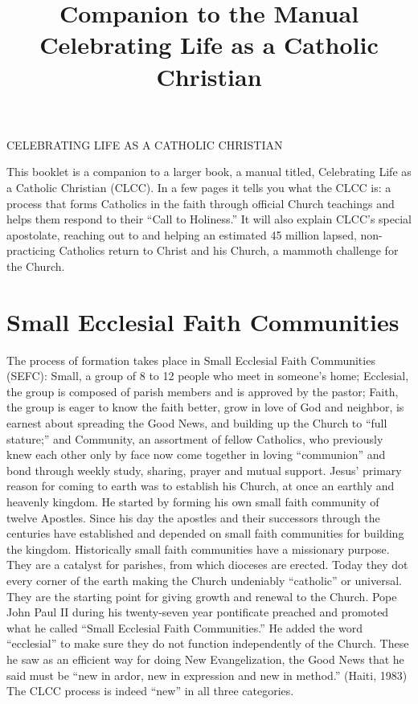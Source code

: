 \documentclass{article}
\title{\textbf{Companion to the Manual} \\ Celebrating Life as a Catholic Christian}
\date{}
\begin{document}
CELEBRATING LIFE AS A CATHOLIC CHRISTIAN

This booklet is a companion to a larger book, a manual titled, Celebrating Life
as a Catholic Christian (CLCC). In a few pages it tells you what the CLCC is: a
process that forms Catholics in the faith through official Church teachings and
helps them respond to their ``Call to Holiness.'' It will also explain CLCC's
special apostolate, reaching out to and helping an estimated 45 million lapsed,
non-practicing Catholics return to Christ and his Church, a mammoth challenge
for the Church.

\section{Small Ecclesial Faith Communities}

The process of formation takes place in Small Ecclesial Faith Communities
(SEFC): Small, a group of 8 to 12 people who meet in someone's home; Ecclesial,
the group is composed of parish members and is approved by the pastor; Faith,
the group is eager to know the faith better, grow in love of God and neighbor,
is earnest about spreading the Good News, and building up the Church to ``full
stature;'' and Community, an assortment of fellow Catholics, who previously knew
each other only by face now come together in loving ``communion'' and bond
through weekly study, sharing, prayer and mutual support.
Jesus' primary reason for coming to earth was to establish his Church, at once
an earthly and heavenly kingdom. He started by forming his own small faith
community of twelve Apostles. Since his day the apostles and their successors
through the centuries have established and depended on small faith communities
for building the kingdom. Historically small faith communities have a missionary
purpose. They are a catalyst for parishes, from which dioceses are
erected. Today they dot every corner of the earth making the Church undeniably
``catholic'' or universal. They are the starting point for giving growth and
renewal to the Church.
Pope John Paul II during his twenty-seven year pontificate preached and promoted
what he called ``Small Ecclesial Faith Communities.'' He added the word
``ecclesial'' to make sure they do not function independently of the
Church. These he saw as an efficient way for doing New Evangelization, the Good
News that he said must be ``new in ardor, new in expression and new in method.''
(Haiti, 1983) The CLCC process is indeed ``new'' in all three categories.
\end{document}
